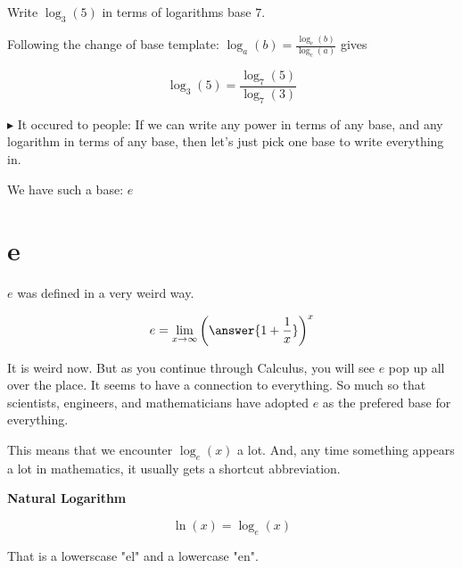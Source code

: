 \documentclass{ximera}
\begin{document}
\begin{example}


Write $\log_3(5)$ in terms of logarithms base $7$.


\begin{explanation}


Following the change of base template: $\log_a(b)  =  \frac{\log_c(b)}{\log_c(a)} $ gives



\[   \log_3(5)  =  \frac{\log_7(5)}{\log_7(3)}         \]



\end{explanation}
\end{example}


















$\blacktriangleright$ It occured to people: If we can write any power in terms of any base, and any logarithm in terms of any base, then let's just pick one base to write everything in.


We have such a base: $e$


\section{e}



\begin{fact} $e$ was defined in a very weird way.

\[   e = \lim_{x \to \infty}  \left(\answer{1 + \frac{1}{x}}\right)^x      \]

\end{fact}




It is weird now.  But as you continue through Calculus, you will see $e$ pop up all over the place.  It seems to have a connection to everything.  So much so that scientists, engineers, and mathematicians have  adopted $e$ as the prefered base for everything.


This means that we encounter $\log_e(x)$ a lot.  And, any time something appears a lot in mathematics, it usually gets a shortcut abbreviation.




\begin{definition}  \textbf{\textcolor{green!50!black}{Natural Logarithm}} 


\[     \ln(x) = \log_e(x) \]


That is a lowerscase "el" and a lowercase "en".


\end{definition}
\end{document}

